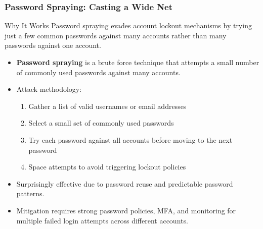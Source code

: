 \documentclass{beamer}
\begin{document}
\begin{frame}
    \frametitle{Password Spraying: Casting a Wide Net}
    
    \begin{alertblock}{Why It Works}
        Password spraying evades account lockout mechanisms by trying just a few common passwords against many accounts rather than many passwords against one account.
    \end{alertblock}
    
    \begin{itemize}
        \item \textbf{Password spraying} is a brute force technique that attempts a small number of commonly used passwords against many accounts.
        \item Attack methodology:
            \begin{enumerate}
                \item Gather a list of valid usernames or email addresses
                \item Select a small set of commonly used passwords
                \item Try each password against all accounts before moving to the next password
                \item Space attempts to avoid triggering lockout policies
            \end{enumerate}
        \item Surprisingly effective due to password reuse and predictable password patterns.
        \item Mitigation requires strong password policies, MFA, and monitoring for multiple failed login attempts across different accounts.
    \end{itemize}
\end{frame}
\end{document}
